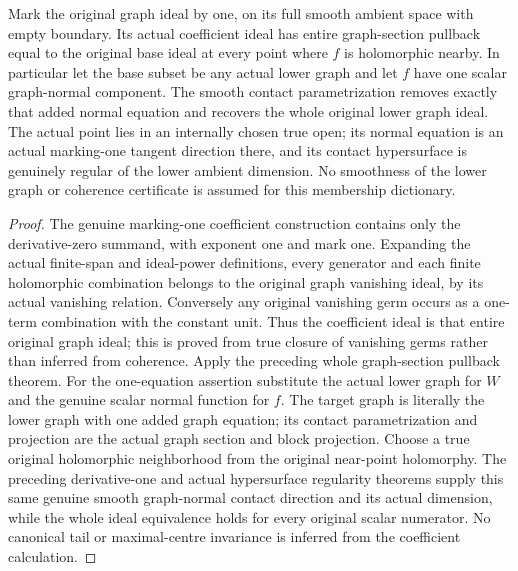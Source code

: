 \begin{theorem}
\label{hir:actual-graph-marking-one-coefficient-slice}
\leanok
Mark the original graph ideal by one, on its full smooth ambient space
with empty boundary. Its actual coefficient ideal has entire graph-section
pullback equal to the original base ideal at every point where $f$ is
holomorphic nearby. In particular let the base subset be any actual
lower graph and let $f$ have one scalar graph-normal component. The smooth
contact parametrization removes exactly that added normal equation and
recovers the whole original lower graph ideal. The actual point lies in an
internally chosen true open; its normal equation is an actual marking-one
tangent direction there, and its contact hypersurface is genuinely regular
of the lower ambient dimension. No smoothness of the lower
graph or coherence certificate is assumed for this membership dictionary.
\end{theorem}
\begin{proof}
The genuine marking-one coefficient construction contains only the
derivative-zero summand, with exponent one and mark one. Expanding the
actual finite-span and ideal-power definitions, every generator and each
finite holomorphic combination belongs to the original graph vanishing
ideal, by its actual vanishing relation. Conversely any original
vanishing germ occurs as a one-term combination with the constant unit.
Thus the coefficient ideal is that entire original graph ideal; this is
proved from true closure of vanishing germs rather than inferred from
coherence. Apply the preceding whole graph-section pullback theorem.
For the one-equation assertion substitute the actual lower graph for
$W$ and the genuine scalar normal function for $f$. The target graph is
literally the lower graph with one added graph equation; its contact
parametrization and projection are the actual graph section and block
projection. Choose a true original holomorphic neighborhood from the original
near-point holomorphy. The preceding derivative-one and actual hypersurface
regularity theorems supply this same genuine smooth graph-normal contact
direction and its actual dimension, while the whole ideal equivalence holds
for every original scalar numerator. No canonical tail or maximal-centre
invariance is inferred from the coefficient calculation.
\end{proof}
